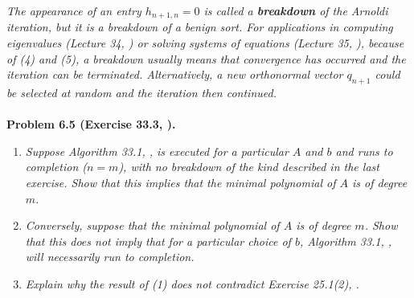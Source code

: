 \documentclass[a4paper,oneside]{book}
\numberwithin{equation}{chapter}
\begin{document}
\textit{The appearance of an entry $h_{n+1,n}=0$ is called a \textbf{breakdown} of the Arnoldi iteration, but it is a breakdown of a benign sort. For applications in computing eigenvalues (Lecture 34, \cite{1}) or solving systems of equations (Lecture 35, \cite{1}), because of (4) and (5), a breakdown usually means that convergence has occurred and the iteration can be terminated. Alternatively, a new orthonormal vector $q_{n+1}$ could be selected at random and the iteration then continued.}\\
\\
\textbf{Problem 6.5 (Exercise 33.3, \cite{1}).}
\begin{enumerate}
\item \textit{Suppose Algorithm 33.1, \cite{1}, is executed for a particular $A$ and $b$ and runs to completion ($n=m$), with no breakdown of the kind described in the last exercise. Show that this implies that the minimal polynomial of $A$ is of degree $m$.}
\item \textit{Conversely, suppose that the minimal polynomial of $A$ is of degree $m$. Show that this does not imply that for a particular choice of $b$, Algorithm 33.1, \cite{1}, will necessarily run to completion.}
\item \textit{Explain why the result of (1) does not contradict Exercise 25.1(2), \cite{1}.}
\end{enumerate}
\end{document}
